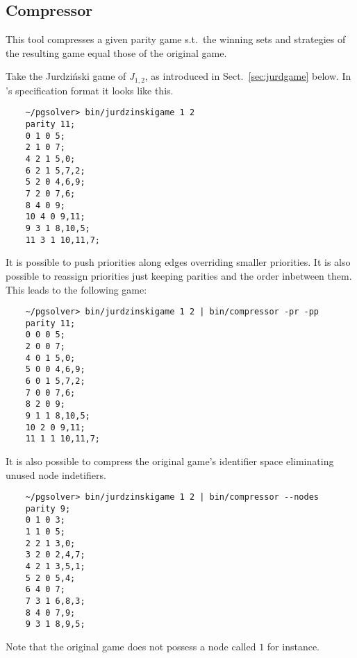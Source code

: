 \subsection{Compressor}

This tool compresses a given parity game s.t.\ the winning sets and strategies of
the resulting game equal those of the original game.

\begin{example}
Take the Jurdzi{\'n}ski game of $J_{1, 2}$, as introduced in Sect.~\ref{sec:jurdgame} below.
In \pgsolver's specification format it looks like this.
\begin{verbatim}
    ~/pgsolver> bin/jurdzinskigame 1 2
    parity 11;
    0 1 0 5;
    2 1 0 7;
    4 2 1 5,0;
    6 2 1 5,7,2;
    5 2 0 4,6,9;
    7 2 0 7,6;
    8 4 0 9;
    10 4 0 9,11;
    9 3 1 8,10,5;
    11 3 1 10,11,7;
\end{verbatim}
It is possible to push priorities along edges overriding smaller priorities. It is also possible
to reassign priorities just keeping parities and the order inbetween them. This leads to the
following game:
\begin{verbatim}
    ~/pgsolver> bin/jurdzinskigame 1 2 | bin/compressor -pr -pp
    parity 11;
    0 0 0 5;
    2 0 0 7;
    4 0 1 5,0;
    5 0 0 4,6,9;
    6 0 1 5,7,2;
    7 0 0 7,6;
    8 2 0 9;
    9 1 1 8,10,5;
    10 2 0 9,11;
    11 1 1 10,11,7;
\end{verbatim}
It is also possible to compress the original game's identifier space eliminating unused node indetifiers.
\begin{verbatim}
    ~/pgsolver> bin/jurdzinskigame 1 2 | bin/compressor --nodes
    parity 9;
    0 1 0 3;
    1 1 0 5;
    2 2 1 3,0;
    3 2 0 2,4,7;
    4 2 1 3,5,1;
    5 2 0 5,4;
    6 4 0 7;
    7 3 1 6,8,3;
    8 4 0 7,9;
    9 3 1 8,9,5;
\end{verbatim}
Note that the original game does not possess a node called $1$ for instance.
\end{example}

